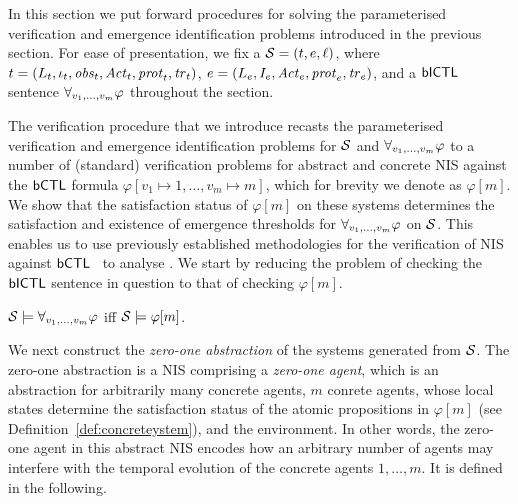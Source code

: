 In this section we put forward procedures for solving the parameterised
verification and emergence identification problems introduced in the previous
section. For ease of presentation,  we fix a \panos{} $\mathcal S = \left ( t, e, \ell \right )$,
where ${t} = \left ( L_{t}, \iota_{t}, \mathit{obs}_{t}, \mathit{Act}_{t}, \mathit{prot}_{t}, \mathit{tr}_{t}  \right )$,
${e} = \left ( L_{e}, I_e, \mathit{Act}_{e}, \mathit{prot}_{e}, \mathit{tr}_{e}  \right )$, and a $\sf{bICTL}$ sentence
$\forall_{v_1,\ldots,v_m} \varphi$ throughout the section. 

The verification procedure that we introduce recasts the
parameterised verification and emergence identification problems for $\mathcal S$
and $\forall_{v_1,\ldots,v_m} \varphi$ to a number of (standard) verification problems for abstract
and concrete NIS against the $\sf{bCTL}$ formula
$\varphi[v_1 \mapsto 1, \ldots, v_m \mapsto m]$, which for
brevity we denote as $\varphi[m]$.  We show that the satisfaction
status of $\varphi[m]$ on these systems
determines the satisfaction and existence of emergence thresholds  for 
$\forall_{v_1,\ldots,v_m} \varphi$ on $\mathcal S$. This enables us to use previously established
methodologies for the verification of NIS against $\sf{bCTL}$~\cite{Akintunde+20b}
to analyse \panos{}.
We start by reducing the problem of checking the $\sf{bICTL}$ sentence in
question to that of checking $\varphi[m]$.


\begin{lemma}
\label{lemma:symmetry}
$\mathcal S \models \forall_{v_1,\ldots,v_m} \varphi$ iff $\mathcal S \models \varphi[m]$.
\end{lemma}

We next construct the \emph{zero-one abstraction} of the
systems generated from $\mathcal S$. The zero-one abstraction is
a NIS comprising a {\em zero-one agent}, which is an
abstraction for arbitrarily many concrete agents, $m$
conrete agents, whose local states determine the
satisfaction status of the atomic propositions in
$\varphi[m]$ (see Definition~\ref{def:concreteystem}), and
the environment. In other words, the zero-one agent in this
abstract NIS encodes how an arbitrary number of agents may
interfere with the temporal evolution of the concrete agents
$1, \ldots, m$. It is defined in the following.

